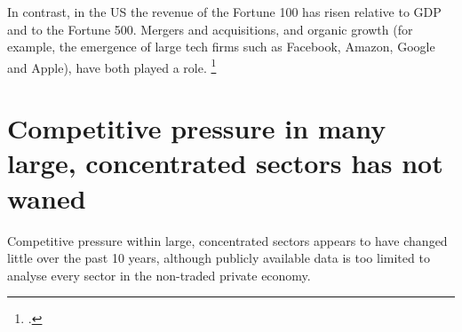 

In contrast, in the US the revenue of the Fortune 100 has risen relative to GDP and to the Fortune 500. Mergers and acquisitions, and organic growth (for example, the emergence of large tech firms such as Facebook, Amazon, Google and Apple), have both played a role.%
    \footcite{Econsuperstar2016}


\section{Competitive pressure in many large, concentrated sectors has not waned}

Competitive pressure within large, concentrated sectors appears to have changed little over the past 10 years, although publicly available data is too limited to analyse every sector in the non-traded private economy.




